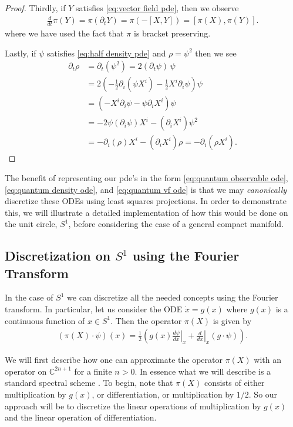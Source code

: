 \documentclass[12pt]{amsart}
\begin{document}
\begin{proof}
	Thirdly, if $Y$ satisfies \eqref{eq:vector field pde}, then we observe 
	\begin{align}
		\frac{d}{dt} \pi(Y) = \pi ( \partial_{t} Y ) = \pi( - [X,Y] ) = [\pi(X) , \pi(Y) ].
	\end{align}
	where we have used the fact that $\pi$ is bracket preserving.
	
	Lastly, if $\psi$ satisfies \eqref{eq:half density pde} and $\rho = \psi^{2}$ then we see
	\begin{align}
		\partial_{t} \rho &= \partial_{t} ( \psi^{2}) = 2 (\partial_{t} \psi ) \, \psi \\
		&= 2 \left( - \frac{1}{2} \partial_{i} (\psi X^{i}) - \frac{1}{2} X^{i} \partial_{i} \psi \right) \psi \\
		&= \left( - X^{i} \partial_{i} \psi - \psi \partial_{i} X^{i}  \right) \psi \\
		&= - 2 \psi (\partial_{i} \psi) X^{i} - (\partial_{i}X^{i}) \psi^{2}\\
		&= - \partial_{i}(\rho) X^{i} - (\partial_{i}X^{i}) \rho = - \partial_{i} ( \rho X^{i}).
	\end{align}
\end{proof}


The benefit of representing our pde's in the form \eqref{eq:quantum observable ode},\eqref{eq:quantum density ode}, and \eqref{eq:quantum vf ode}
is that we may \emph{canonically} discretize these ODEs using least squares projections.  In order to demonstrate this, we will illustrate a detailed implementation of how this would be done on the unit circle, $S^1$, before considering the case of a general compact manifold.

\subsection{Discretization on $S^1$ using the Fourier Transform}
In the case of $S^1$ we can discretize all the needed concepts using the Fourier transform.  In particular, let us consider the ODE $\dot{x} = g(x)$ where
$g(x)$ is a continuous function of $x \in S^1$.
Then the operator $\pi(X)$ is given by
\begin{align}
	\left( \pi(X) \cdot \psi \right)(x) = \frac{1}{2}
	\left( g(x) \left.\frac{d\psi}{dx}\right|_x 
	+ \left. \frac{d}{dx} \right|_x (g \cdot \psi ) \right). \label{eq:S1 op}
\end{align}

We will first describe how one can approximate the operator $\pi(X)$ with an operator on $\mathbb{C}^{2n+1}$ for a finite $n > 0$.
In essence what we will describe is a standard spectral scheme \cite{Boyd2001,NumericalRecipes}.
To begin, note that $\pi(X)$ consists of either multiplication by $g(x)$, or differentiation, or multiplication by $1/2$.  So our approach will be to discretize the linear operations of multiplication by $g(x)$ and the linear operation of differentiation.
\end{document}
